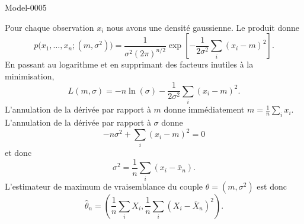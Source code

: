 
\begin{corrige}{Model-0005}

    Pour chaque observation \( x_i\) nous avons une densité gaussienne. Le produit donne
    \begin{equation}
        p\big( x_1,\ldots,x_n;(m,\sigma^2) \big)=\frac{1}{ \sigma^2(2\pi)^{n/2} }\exp\left[ -\frac{1}{ 2\sigma^2 }\sum_i(x_i-m)^2 \right].
    \end{equation}
    En passant au logarithme et en supprimant des facteurs inutiles à la minimisation,
    \begin{equation}
        L(m,\sigma)=-n\ln(\sigma)-\frac{1}{ 2\sigma^2 }\sum_i(x_i-m)^2.
    \end{equation}
    L'annulation de la dérivée par rapport à \( m\) donne immédiatement \( m=\frac{1}{ n }\sum_i x_i\). L'annulation de la dérivée par rapport à \( \sigma\) donne
    \begin{equation}
        -n\sigma^2+\sum_i(x_i-m)^2=0
    \end{equation}
    et donc
    \begin{equation}
        \sigma^2=\frac{1}{ n }\sum_i(x_i-\bar x_n).
    \end{equation}
    L'estimateur de maximum de vraisemblance du couple \( \theta=(m,\sigma^2)\) est donc
    \begin{equation}
        \hat\theta_n=\left( \frac{1}{ n }\sum_iX_i,\frac{1}{ n }\sum_i(X_i-\bar X_n)^2 \right).
    \end{equation}

\end{corrige}
